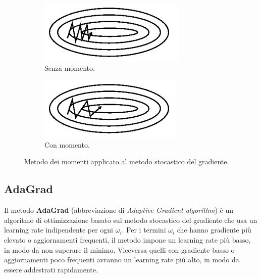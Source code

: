 \begin{figure}[h]
\centering
\begin{subfigure}{.5\textwidth}
  \centering
  \includegraphics[width=\linewidth]{images/Training (teoria)/SGD Momentum a.PNG}
  \caption{Senza momento.}
\end{subfigure}%
\begin{subfigure}{.5\textwidth}
  \centering
  \includegraphics[width=\linewidth]{images/Training (teoria)/SGD Momentum b.PNG}
  \caption{Con momento.}
\end{subfigure}
\caption{Metodo dei momenti applicato al metodo stocastico del gradiente. \cite{ruder_2022}}
\label{MomentumMethod}
\end{figure}

\newpage
\subsection{AdaGrad \cite{JMLR:v12:duchi11a}}
Il metodo \textbf{AdaGrad} (abbreviazione di \textit{Adaptive Gradient algorithm})  è un algoritmo di ottimizzazione basato sul metodo stocastico del gradiente che usa un learning rate indipendente per ogni $\omega_i$. Per i termini $\omega_i$ che hanno gradiente più elevato o aggiornamenti frequenti, il metodo impone un learning rate più basso, in modo da non superare il minimo. Viceversa quelli con gradiente basso o aggiornamenti poco frequenti avranno un learning rate più alto, in modo da essere addestrati rapidamente.\\



